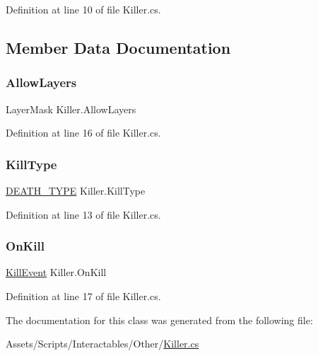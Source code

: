 Definition at line 10 of file Killer.\+cs.



\subsection{Member Data Documentation}
\mbox{\label{class_killer_a903205bb086ca8df71c9a7c2069a6429}} 
\subsubsection{\texorpdfstring{Allow\+Layers}{AllowLayers}}
{\footnotesize\ttfamily Layer\+Mask Killer.\+Allow\+Layers}



Definition at line 16 of file Killer.\+cs.

\mbox{\label{class_killer_ad7cce6f398d043f17c809ad41fe9f18d}} 
\subsubsection{\texorpdfstring{Kill\+Type}{KillType}}
{\footnotesize\ttfamily \mbox{\hyperlink{_animal_8cs_aa09ea87b75a706096f010aef7b9b1826}{D\+E\+A\+T\+H\+\_\+\+T\+Y\+PE}} Killer.\+Kill\+Type}



Definition at line 13 of file Killer.\+cs.

\mbox{\label{class_killer_ac72e298451c58bc747a4b98edc2a9cb0}} 
\subsubsection{\texorpdfstring{On\+Kill}{OnKill}}
{\footnotesize\ttfamily \mbox{\hyperlink{class_killer_1_1_kill_event}{Kill\+Event}} Killer.\+On\+Kill}



Definition at line 17 of file Killer.\+cs.



The documentation for this class was generated from the following file\+:\begin{DoxyCompactItemize}
\item 
Assets/\+Scripts/\+Interactables/\+Other/\mbox{\hyperlink{_killer_8cs}{Killer.\+cs}}\end{DoxyCompactItemize}
